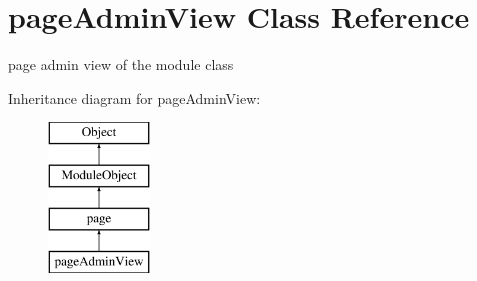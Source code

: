 \hypertarget{classpageAdminView}{\section{page\+Admin\+View Class Reference}
\label{classpageAdminView}
}


page admin view of the module class  


Inheritance diagram for page\+Admin\+View\+:\begin{figure}[H]
\begin{center}
\leavevmode
\includegraphics[height=4.000000cm]{classpageAdminView}
\end{center}
\end{figure}
